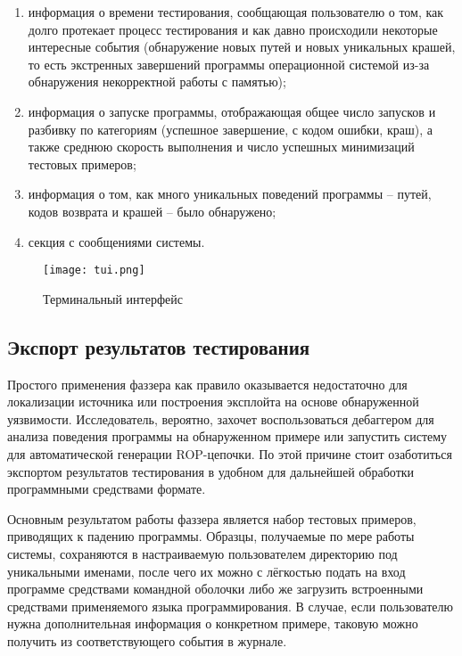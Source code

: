 \begin{enumerate}
	\item информация о времени тестирования, сообщающая пользователю о том, как долго протекает процесс тестирования и как давно происходили некоторые интересные события (обнаружение новых путей и новых уникальных крашей, то есть экстренных завершений программы операционной системой из-за обнаружения некорректной работы с памятью);
	
	\item информация о запуске программы, отображающая общее число запусков и разбивку по категориям (успешное завершение, с кодом ошибки, краш), а также среднюю скорость выполнения и число успешных минимизаций тестовых примеров;
	
	\item информация о том, как много уникальных поведений программы -- путей, кодов возврата и крашей -- было обнаружено;
	
	\item секция с сообщениями системы.
\end{enumerate}

\begin{figure}[h]
	\centering
	\texttt{[image: tui.png]}
	\caption{Терминальный интерфейс}
	\label{fig:tui}
\end{figure}%

\subsection{Экспорт результатов тестирования}

Простого применения фаззера как правило оказывается недостаточно для локализации источника или построения эксплойта на основе обнаруженной уязвимости. Исследователь, вероятно, захочет воспользоваться дебаггером для анализа поведения программы на обнаруженном примере или запустить систему для автоматической генерации ROP-цепочки. По этой причине стоит озаботиться экспортом результатов тестирования в удобном для дальнейшей обработки программными средствами формате.

Основным результатом работы фаззера является набор тестовых примеров, приводящих к падению программы. Образцы, получаемые по мере работы системы, сохраняются в настраиваемую пользователем директорию под уникальными именами, после чего их можно с лёгкостью подать на вход программе средствами командной оболочки либо же загрузить встроенными средствами применяемого языка программирования. В случае, если пользователю нужна дополнительная информация о конкретном примере, таковую можно получить из соответствующего события в журнале.

